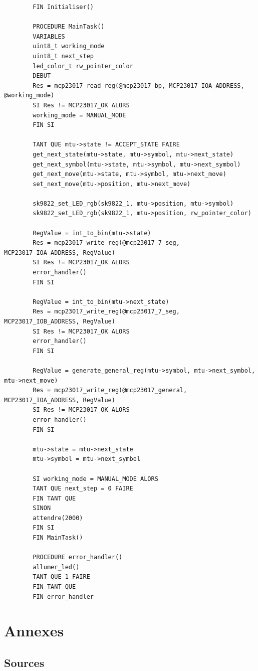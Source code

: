 \documentclass[12pt]{report}
\begin{document}
\begin{lstlisting}
		FIN Initialiser()
		
		PROCEDURE MainTask()
		VARIABLES
		uint8_t working_mode
		uint8_t next_step
		led_color_t rw_pointer_color
		DEBUT
		Res = mcp23017_read_reg(@mcp23017_bp, MCP23017_IOA_ADDRESS, @working_mode)
		SI Res != MCP23017_OK ALORS
		working_mode = MANUAL_MODE
		FIN SI
		
		TANT QUE mtu->state != ACCEPT_STATE FAIRE
		get_next_state(mtu->state, mtu->symbol, mtu->next_state)
		get_next_symbol(mtu->state, mtu->symbol, mtu->next_symbol)
		get_next_move(mtu->state, mtu->symbol, mtu->next_move)
		set_next_move(mtu->position, mtu->next_move)
		
		sk9822_set_LED_rgb(sk9822_1, mtu->position, mtu->symbol)
		sk9822_set_LED_rgb(sk9822_1, mtu->position, rw_pointer_color)
		
		RegValue = int_to_bin(mtu->state)
		Res = mcp23017_write_reg(@mcp23017_7_seg, MCP23017_IOA_ADDRESS, RegValue)
		SI Res != MCP23017_OK ALORS
		error_handler()
		FIN SI
		
		RegValue = int_to_bin(mtu->next_state)
		Res = mcp23017_write_reg(@mcp23017_7_seg, MCP23017_IOB_ADDRESS, RegValue)
		SI Res != MCP23017_OK ALORS
		error_handler()
		FIN SI
		
		RegValue = generate_general_reg(mtu->symbol, mtu->next_symbol, mtu->next_move)
		Res = mcp23017_write_reg(@mcp23017_general, MCP23017_IOA_ADDRESS, RegValue)
		SI Res != MCP23017_OK ALORS
		error_handler()
		FIN SI
		
		mtu->state = mtu->next_state
		mtu->symbol = mtu->next_symbol
		
		SI working_mode = MANUAL_MODE ALORS
		TANT QUE next_step = 0 FAIRE
		FIN TANT QUE
		SINON
		attendre(2000)
		FIN SI
		FIN MainTask()
		
		PROCEDURE error_handler()
		allumer_led()
		TANT QUE 1 FAIRE
		FIN TANT QUE
		FIN error_handler
	\end{lstlisting}
	\chapter{Annexes}
	\section{Sources}
\end{document}
